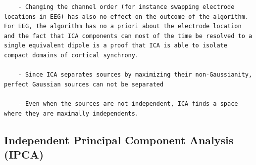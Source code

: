 \documentclass[
]{book}
\begin{document}
\begin{verbatim}
    - Changing the channel order (for instance swapping electrode locations in EEG) has also no effect on the outcome of the algorithm. For EEG, the algorithm has no a priori about the electrode location and the fact that ICA components can most of the time be resolved to a single equivalent dipole is a proof that ICA is able to isolate compact domains of cortical synchrony.

    - Since ICA separates sources by maximizing their non-Gaussianity, perfect Gaussian sources can not be separated

    - Even when the sources are not independent, ICA finds a space where they are maximally independents.
\end{verbatim}

\hypertarget{independent-principal-component-analysis-ipca}{%
\subsection{Independent Principal Component Analysis (IPCA)}\label{independent-principal-component-analysis-ipca}}
\end{document}
